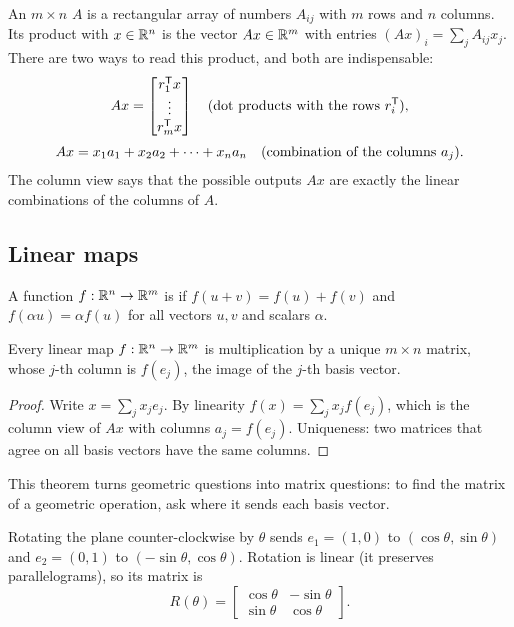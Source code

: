 An $m\times n$  $A$ is a rectangular array of numbers $A_{ij}$ with $m$ rows and $n$ columns. Its product
with $x \in \mathbb{R}^n$ is the vector $Ax \in \mathbb{R}^m$ with entries $(Ax)_i = \sum_j A_{ij}x_j$. There are two ways to read
this product, and both are indispensable:
\begin{equation}
\begin{gathered}
  Ax = \begin{bmatrix} r_1^{\mathsf{T}} x \\ \vdots \\ r_m^{\mathsf{T}} x \end{bmatrix}
  \quad\text{(dot products with the rows $r_i^{\mathsf{T}}$)},
  \\[2pt]
  Ax = x_1a_1 + x_2a_2 + \dots + x_na_n
  \quad\text{(combination of the columns $a_j$)}.
\end{gathered}
\end{equation}
The column view says that the possible outputs $Ax$ are exactly the linear combinations of the columns of $A$.

\subsection{Linear maps}

\begin{definition}
A function $f: \mathbb{R}^n \to \mathbb{R}^m$ is  if $f(u + v) = f(u) + f(v)$ and $f(\alpha u) = \alpha f(u)$ for all
vectors $u, v$ and scalars $\alpha$.
\end{definition}

\begin{theorem}
Every linear map $f: \mathbb{R}^n\to\mathbb{R}^m$ is multiplication by a unique $m\times n$ matrix, whose $j$-th column is $f(e_j)$, the
image of the $j$-th basis vector.
\end{theorem}
\begin{proof}
Write $x = \sum_j x_je_j$. By linearity $f(x) = \sum_jx_jf(e_j)$, which is the column view of $Ax$ with columns
$a_j = f(e_j)$. Uniqueness: two matrices that agree on all basis vectors have the same columns.
\end{proof}

This theorem turns geometric questions into matrix questions: to find the matrix of a geometric operation, ask
where it sends each basis vector.

\begin{example}
\label{ex:rot2d}
Rotating the plane counter-clockwise by $\theta$ sends $e_1 = (1, 0)$ to $(\cos\theta, \sin\theta)$ and
$e_2 = (0, 1)$ to $(-\sin\theta, \cos\theta)$. Rotation is linear (it preserves parallelograms), so its matrix is
\begin{equation}
  R(\theta) = \begin{bmatrix} \cos\theta & -\sin\theta \\ \sin\theta & \cos\theta \end{bmatrix}.
\end{equation}
\end{example}


